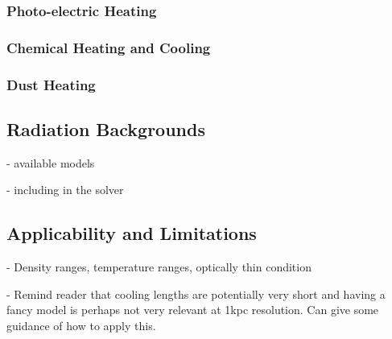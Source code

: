 \subsubsection{Photo-electric Heating}


\subsubsection{Chemical Heating and Cooling}


\subsubsection{Dust Heating}



\subsection{Radiation Backgrounds}
\label{section:radback}
- available models

- including in the solver


\subsection{Applicability and Limitations}
- Density ranges, temperature ranges, optically thin condition

- Remind reader that cooling lengths are potentially very short and
having a fancy model is perhaps not very relevant at 1kpc
resolution. Can give some guidance of how to apply this.
